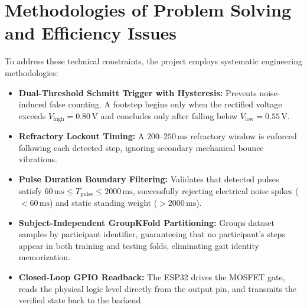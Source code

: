 \section{Methodologies of Problem Solving and Efficiency Issues}
To address these technical constraints, the project employs systematic engineering methodologies:
\begin{itemize}
    \item \textbf{Dual-Threshold Schmitt Trigger with Hysteresis:} Prevents noise-induced false counting. A footstep begins only when the rectified voltage exceeds $V_{\text{high}} = 0.80\,\text{V}$ and concludes only after falling below $V_{\text{low}} = 0.55\,\text{V}$.
    \item \textbf{Refractory Lockout Timing:} A $200\text{--}250\,\text{ms}$ refractory window is enforced following each detected step, ignoring secondary mechanical bounce vibrations.
    \item \textbf{Pulse Duration Boundary Filtering:} Validates that detected pulses satisfy $60\,\text{ms} \le T_{\text{pulse}} \le 2000\,\text{ms}$, successfully rejecting electrical noise spikes ($<60\,\text{ms}$) and static standing weight ($>2000\,\text{ms}$).
    \item \textbf{Subject-Independent GroupKFold Partitioning:} Groups dataset samples by participant identifier, guaranteeing that no participant's steps appear in both training and testing folds, eliminating gait identity memorization.
    \item \textbf{Closed-Loop GPIO Readback:} The ESP32 drives the MOSFET gate, reads the physical logic level directly from the output pin, and transmits the verified state back to the backend.
\end{itemize}

